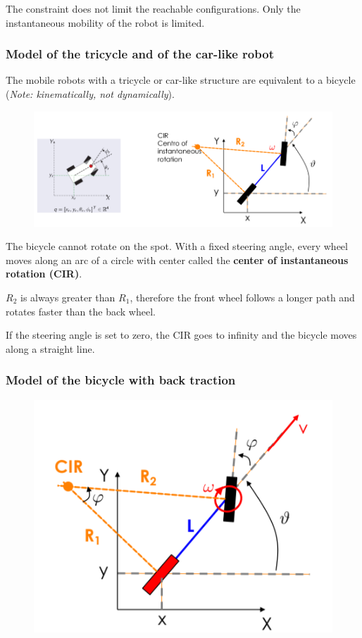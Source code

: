 The constraint does not limit the reachable configurations. Only the instantaneous mobility of the robot is limited.

\hfill

\subsubsection{Model of the tricycle and of the car-like robot}

The mobile robots with a tricycle or car-like structure are equivalent to a bicycle (\textit{Note: kinematically, not dynamically}).

\begin{figure}[H]
    \centering
    \includegraphics[width=1\linewidth]{imgs/tricycle_car_like_model.png}
\end{figure}

The bicycle cannot rotate on the spot. With a fixed steering angle, every wheel moves along an arc of a circle with center called the \textbf{center of instantaneous rotation (CIR)}.

$R_2$ is always greater than $R_1$, therefore the front wheel follows a longer path and rotates faster than the back wheel.  

If the steering angle is set to zero, the CIR goes to infinity and the bicycle moves along a straight line.  

\hfill

\subsubsection{Model of the bicycle with back traction}

\begin{figure}[H]
    \centering
    \includegraphics[width=0.5\linewidth]{imgs/bicycle_back_traction.png}
\end{figure}

